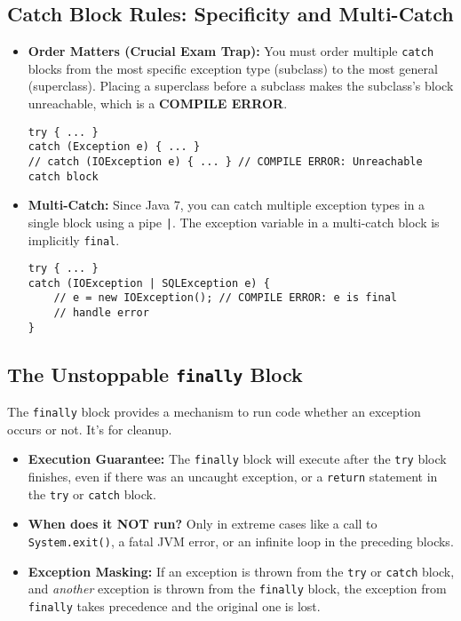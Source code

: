 \documentclass[12pt]{article}
\begin{document}
\begin{enumerate}[label=(\arabic*)]
\subsection{Catch Block Rules: Specificity and Multi-Catch}
\begin{itemize}
    \item \textbf{Order Matters (Crucial Exam Trap):} You must order multiple \texttt{catch} blocks from the most specific exception type (subclass) to the most general (superclass). Placing a superclass before a subclass makes the subclass's block unreachable, which is a \textbf{COMPILE ERROR}.
\begin{verbatim}
try { ... }
catch (Exception e) { ... }
// catch (IOException e) { ... } // COMPILE ERROR: Unreachable catch block
\end{verbatim}
    \item \textbf{Multi-Catch:} Since Java 7, you can catch multiple exception types in a single block using a pipe \texttt{|}. The exception variable in a multi-catch block is implicitly \texttt{final}.
\begin{verbatim}
try { ... }
catch (IOException | SQLException e) {
    // e = new IOException(); // COMPILE ERROR: e is final
    // handle error
}
\end{verbatim}
\end{itemize}

\subsection{The Unstoppable \texttt{finally} Block}
The \texttt{finally} block provides a mechanism to run code whether an exception occurs or not. It's for cleanup.
\begin{itemize}
    \item \textbf{Execution Guarantee:} The \texttt{finally} block will execute after the \texttt{try} block finishes, even if there was an uncaught exception, or a \texttt{return} statement in the \texttt{try} or \texttt{catch} block.
    \item \textbf{When does it NOT run?} Only in extreme cases like a call to \texttt{System.exit()}, a fatal JVM error, or an infinite loop in the preceding blocks.
    \item \textbf{Exception Masking:} If an exception is thrown from the \texttt{try} or \texttt{catch} block, and \textit{another} exception is thrown from the \texttt{finally} block, the exception from \texttt{finally} takes precedence and the original one is lost.
\end{itemize}


\end{enumerate}
\end{document}
